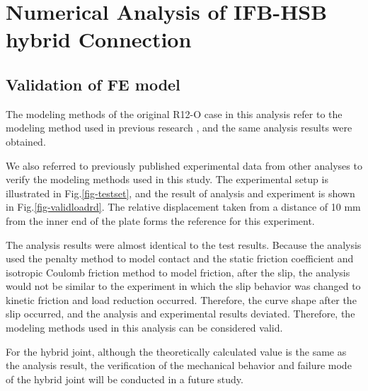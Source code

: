 \chapter{Numerical Analysis of IFB-HSB hybrid Connection}
\label{ch5}

\begin{spacing}{1.25} %
\minitoc %
\end{spacing} %
\onehalfspacing %

\kant[1-2]


\section{Validation of FE model}

The modeling methods of  the original R12-O case in this analysis refer to the modeling method used in previous research \cite{Peng2013}, and the same analysis results were obtained.

We also referred to previously published experimental data \cite{peng2010} from other analyses to verify the modeling methods used in this study. The experimental setup is illustrated in Fig.\ref{fig-testset}, and the result of analysis and experiment is shown in Fig.\ref{fig-validloadrd}. The relative displacement taken from a distance of 10 mm from the inner end of the plate forms the reference for this experiment.

The analysis results were almost identical to the test results. Because the analysis used the penalty method to model contact and the static friction coefficient and isotropic Coulomb friction method to model friction, after the slip, the analysis would not be similar to the experiment in which the slip behavior was changed to kinetic friction and load reduction occurred. Therefore, the curve shape after the slip occurred, and the analysis and experimental results deviated. Therefore, the modeling methods used in this analysis can be considered valid.

For the hybrid joint, although the theoretically calculated value is the same as the analysis result, the verification of the mechanical behavior and failure mode of the hybrid joint will be conducted in a future study.


